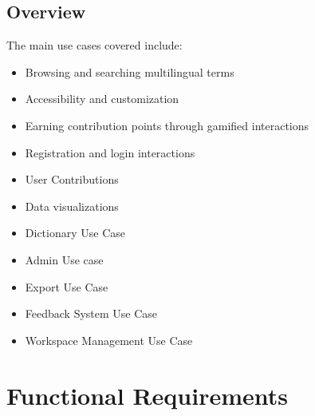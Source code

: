 \documentclass[12pt]{article}
\begin{document}
\subsection{Overview}
The main use cases covered include:
\begin{itemize}
  \item Browsing and searching multilingual terms
  \item Accessibility and customization
  \item Earning contribution points through gamified interactions
  \item Registration and login interactions
  \item User Contributions
  \item Data visualizations
  \item Dictionary Use Case
  \item Admin Use case
  \item Export Use Case
  \item Feedback System Use Case
  \item Workspace Management Use Case
\end{itemize}

\section{Functional Requirements}
\end{document}
